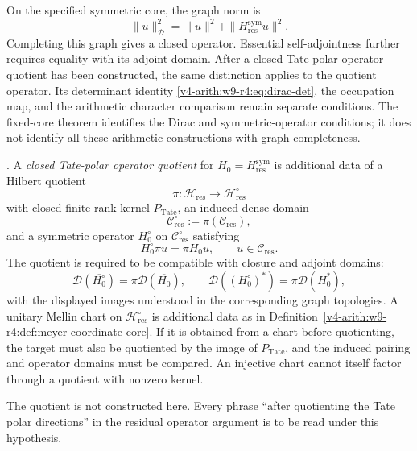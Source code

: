 \begin{remark}
\label{v4-arith:w9-r4:rem:single-estimate-left}
On the specified symmetric core, the graph norm is
\[
 \|u\|_{\mathscr D}^{2}=\|u\|^{2}
       +\|H_{\mathrm{res}}^{\mathrm{sym}}u\|^{2}.
\]
Completing this graph gives a closed operator. Essential
self-adjointness further requires equality with its adjoint domain.
After a closed Tate-polar operator quotient has been constructed,
the same distinction applies to the quotient operator. Its determinant
identity \eqref{v4-arith:w9-r4:eq:dirac-det}, the occupation map,
and the arithmetic character comparison remain separate conditions.
The fixed-core theorem identifies the Dirac and symmetric-operator
conditions; it does not identify all these arithmetic constructions
with graph completeness.
\end{remark}

\begin{definition}
\label{v4-arith:w9-r4:def:tate-polar-operator-quotient}
\ClaimStatusConditional. A \emph{closed Tate-polar operator quotient}
for \(H_{0}=H_{\mathrm{res}}^{\mathrm{sym}}\) is additional data of a
Hilbert quotient
\[
\pi\colon \mathcal{H}_{\mathrm{res}}\longrightarrow
\mathcal{H}_{\mathrm{res}}^{\circ}
\]
with closed finite-rank kernel \(P_{\mathrm{Tate}}\), an induced
dense domain
\[
\mathcal{C}_{\mathrm{res}}^{\circ}:=\pi(\mathcal{C}_{\mathrm{res}}),
\]
and a symmetric operator \(H_{0}^{\circ}\) on
\(\mathcal{C}_{\mathrm{res}}^{\circ}\) satisfying
\[
H_{0}^{\circ}\pi u=\pi H_{0}u,\qquad u\in\mathcal{C}_{\mathrm{res}}.
\]
The quotient is required to be compatible with closure and adjoint
domains:
\[
\mathcal{D}(\overline{H_{0}^{\circ}})
=\pi\mathcal{D}(\overline{H_{0}}),
\qquad
\mathcal{D}((H_{0}^{\circ})^{*})
=\pi\mathcal{D}(H_{0}^{*}),
\]
with the displayed images understood in the corresponding graph
topologies. A unitary Mellin chart on $\mathcal H_{\mathrm{res}}^\circ$
is additional data as in
Definition~\ref{v4-arith:w9-r4:def:meyer-coordinate-core}.
If it is obtained from a chart before quotienting, the target must
also be quotiented by the image of $P_{\mathrm{Tate}}$, and the
induced pairing and operator domains must be compared. An injective
chart cannot itself factor through a quotient with nonzero kernel.

The quotient is not constructed here. Every phrase
``after quotienting the Tate polar directions'' in the residual
operator argument is to be read under this hypothesis.
\end{definition}

